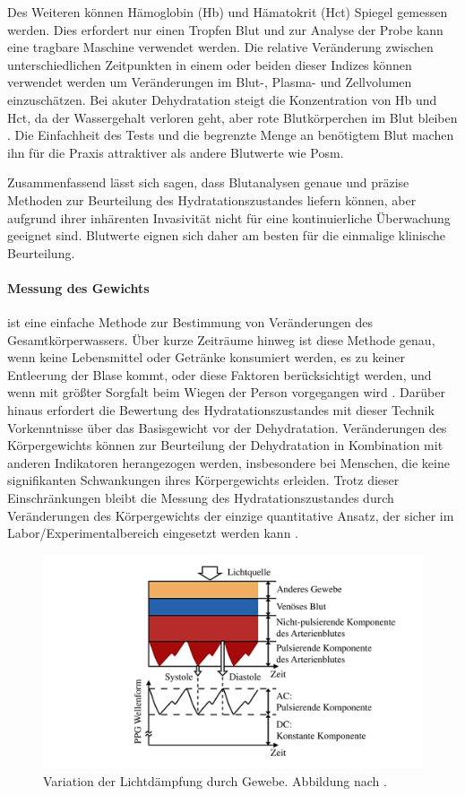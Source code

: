 \documentclass[10pt,a4paper,headinclude,twoside, plainheadsepline, open=right, numbers=noenddot, twocolumn]{article}
\begin{document}
Des Weiteren können Hämoglobin (Hb) und Hämatokrit (Hct) Spiegel gemessen werden.
Dies erfordert nur einen Tropfen Blut und zur Analyse der Probe kann eine tragbare Maschine verwendet werden. 
Die relative Veränderung zwischen unterschiedlichen Zeitpunkten in einem oder beiden dieser Indizes können verwendet werden um Veränderungen im Blut-, Plasma- und Zellvolumen einzuschätzen.
Bei akuter Dehydratation steigt die Konzentration von Hb und Hct, da der Wassergehalt verloren geht, aber rote Blutkörperchen im Blut bleiben \cite{garret2018engineering}.
Die Einfachheit des Tests und die begrenzte Menge an benötigtem Blut machen ihn für die Praxis attraktiver als andere Blutwerte wie Posm.

Zusammenfassend lässt sich sagen, dass Blutanalysen genaue und präzise Methoden zur Beurteilung des Hydratationszustandes liefern können, aber aufgrund ihrer inhärenten Invasivität nicht für eine kontinuierliche Überwachung geeignet sind.
Blutwerte eignen sich daher am besten für die einmalige klinische Beurteilung.

\paragraph{Messung des Gewichts} ist eine einfache Methode zur Bestimmung von Veränderungen des Gesamtkörperwassers.
Über kurze Zeiträume hinweg ist diese Methode genau, wenn keine Lebensmittel oder Getränke konsumiert werden, es zu keiner Entleerung der Blase kommt, oder diese Faktoren berücksichtigt werden, und wenn mit größter Sorgfalt beim Wiegen der Person vorgegangen wird \cite{garret2018engineering}.
Darüber hinaus erfordert die Bewertung des Hydratationszustandes mit dieser Technik Vorkenntnisse über das Basisgewicht vor der Dehydratation.
Veränderungen des Körpergewichts können zur Beurteilung der Dehydratation in Kombination mit anderen Indikatoren herangezogen werden, insbesondere bei Menschen, die keine signifikanten Schwankungen ihres Körpergewichts erleiden. 
Trotz dieser Einschränkungen bleibt die Messung des Hydratationszustandes durch Veränderungen des Körpergewichts der einzige quantitative Ansatz, der sicher im Labor/Experimentalbereich eingesetzt werden kann \cite{kavouras2002assessing}.

\begin{figure}[ht]
	\centering
	\includegraphics[width=0.9\linewidth]{images/waveform.pdf}
	\caption{Variation der Lichtdämpfung durch Gewebe. Abbildung nach \cite{tamura2014wearable}.}
	\label{waveform}
\end{figure}
\end{document}
